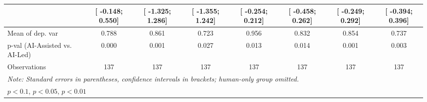 \begin{tabular}{l*{7}{c}}
                    &[   -0.148;     0.550]   &[   -1.325;     1.286]   &[   -1.355;     1.242]   &[   -0.254;     0.212]   &[   -0.458;     0.262]   &[   -0.249;     0.292]   &[   -0.394;     0.396]   \\
\hline
Mean of dep. var    &    0.788   &    0.861   &    0.723   &    0.956   &    0.832   &    0.854   &    0.737   \\
p-val (AI-Assisted vs. AI-Led)&    0.000   &    0.001   &    0.027   &    0.013   &    0.014   &    0.001   &    0.003   \\
Observations        &137   &137   &137   &137   &137   &137   &137   \\
\hline\hline
\multicolumn{8}{l}{\it{Note:} Standard errors in parentheses, confidence intervals in brackets; human-only group omitted.}\\
\multicolumn{8}{l}{\sym{*} \(p<0.1\), \sym{**} \(p<0.05\), \sym{***} \(p<0.01\)}\\
\end{tabular}
